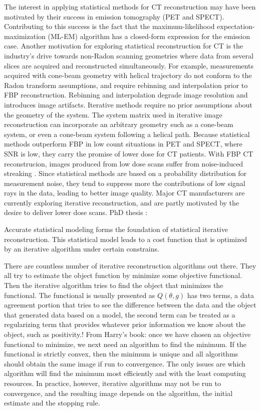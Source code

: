 The interest in applying statistical methods for CT reconstruction may have been motivated by their success in emission tomography (PET and SPECT).  Contributing to this success is the fact that the maximum-likelihood expectation-maximization (ML-EM) algorithm has a closed-form expression for the emission case.  
Another motivation for exploring statistical reconstruction for CT is the industry's drive towards non-Radon scanning geometries where data from several slices are acquired and reconstructed simultaneously.  For example, measurements acquired with cone-beam geometry with helical trajectory do not conform to the Radon transform assumptions, and require rebinning and interpolation prior to FBP reconstruction.  Rebinning and interpolation degrade image resolution and introduces image artifacts.  Iterative methods require no prior assumptions about the geometry of the system.  The system matrix used in iterative image reconstruction can incorporate an arbitrary geometry such as a cone-beam system, or even a cone-beam system following a helical path.  Because statistical methods outperform FBP in low count situations in PET and SPECT, where SNR is low, they carry the promise of lower dose for CT patients.  With FBP CT reconstrucion, images produced from low dose scans suffer from noise-induced streaking \citep{Hsieh1998}.  Since statistical methods are based on a probability distribution for measurement noise, they tend to suppress more the contributions of low signal rays in the data, leading to better image quality.  Major CT manufacturers are currently exploring iterative reconstruction, and are partly motivated by the desire to deliver lower dose scans. PhD thesis :\citep{Elbakri2003}

Accurate statistical modeling forms the foundation of statistical iterative reconstruction.  This statistical model leads to a cost function that is optimized by an iterative algorithm under certain constrains.  

There are countless number of iterative reconstruction algorithms out there.  They all try to estimate the object function by minimize some objective functional.  Then the iterative algorithm tries to find the object that minimizes the functional. The functional is usually presented as $Q(\theta, g)$ has two terms, a data agreement portion that tries to see the difference between the data and the object that generated data based on a model, the second term can be treated as a regularizing term that provides whatever prior information we know about the object, such as positivity.!
From Harry's book: once we have chosen an objective functional to minimize, we next need an algorithm to find the minimum.  If the functional is strictly convex, then the minimum is unique and all algorithms should obtain the same image if run to convergence.  The only issues are which algorithm will find the minimum most efficiently and with the least computing resources.  In practice, however, iterative algorithms may not be run to convergence, and the resulting image depends on the algorithm, the initial estimate and the stopping rule.

